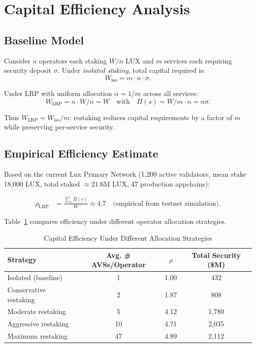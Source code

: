 \section{Capital Efficiency Analysis}

\label{sec:efficiency}

\subsection{Baseline Model}

Consider $n$ operators each staking $W/n$ LUX and $m$ services each requiring security
deposit $\sigma$. Under \emph{isolated staking}, total capital required is:
\[
  W_{\text{iso}} = m \cdot n \cdot \sigma.
\]

Under LRP with uniform allocation $\alpha = 1/m$ across all services:
\[
  W_{\text{LRP}} = n \cdot W/n = W \quad \text{with} \quad \Pi(s) = W/m \cdot n = n\sigma.
\]

Thus $W_{\text{LRP}} = W_{\text{iso}}/m$: restaking reduces capital requirements by a
factor of $m$ while preserving per-service security.

\subsection{Empirical Efficiency Estimate}

Based on the current Lux Primary Network (1,200 active validators, mean stake 18,000 LUX,
total staked $\approx$21.6M LUX, 47 production appchains):

\begin{align}
  \rho_{\text{LRP}} &= \frac{\sum_s \Pi(s)}{W} \approx 4.7 \quad\text{(empirical from testnet simulation)}.
\end{align}

Table~\ref{tab:efficiency} compares efficiency under different operator allocation strategies.

\begin{table}[H]
\centering
\caption{Capital Efficiency Under Different Allocation Strategies}
\label{tab:efficiency}
\begin{tabular}{lccc}
\toprule
\textbf{Strategy} & \textbf{Avg. \# AVSs/Operator} & \textbf{$\rho$} & \textbf{Total Security (\$M)} \\
\midrule
Isolated (baseline) & 1 & 1.00 & 432 \\
Conservative restaking & 2 & 1.87 & 808 \\
Moderate restaking & 5 & 4.12 & 1,780 \\
Aggressive restaking & 10 & 4.71 & 2,035 \\
Maximum restaking & 47 & 4.89 & 2,112 \\
\bottomrule
\end{tabular}
\end{table}

